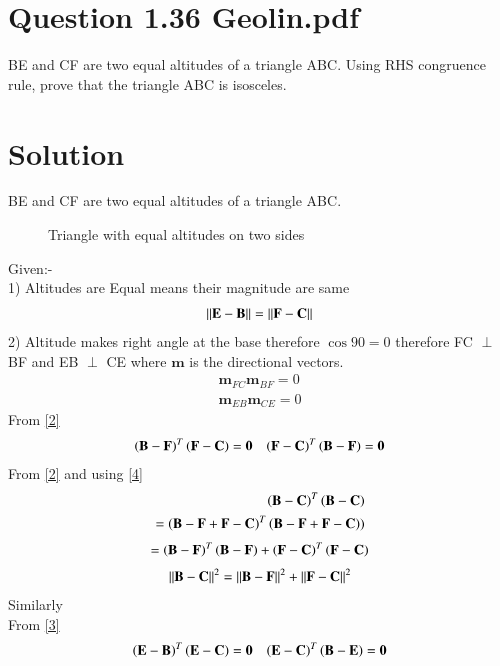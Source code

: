 \documentclass[journal,12pt,twocolumn]{IEEEtran}
\begin{document}
\section{Question 1.36 Geolin.pdf }
BE and CF are two equal altitudes of a triangle ABC. Using RHS congruence rule, prove that the triangle ABC is isosceles.
\section{Solution}
BE and CF are two equal altitudes of a triangle ABC.
\captionsetup{justification=centering}
\begin{figure}[!h]
\centering
\resizebox{.5\columnwidth}{!}{}
\caption{Triangle with equal altitudes on two sides}
\label{myfig}
\end{figure}
Given:-\\
1) Altitudes are Equal means their magnitude are same
 \begin{align}
 	\left\lVert\mathbf{E} - \mathbf{B}\right\rVert = \left\lVert\mathbf{F} - \mathbf{C}\right\rVert \label{1}
 \end{align}
2) Altitude makes right angle at the base therefore $\cos 90 =0$ therefore  FC $\perp$ BF and EB $\perp$ CE where $\textbf{m}$ is the directional vectors.
\begin{align}
\textbf{m}_{FC} \textbf{m}_{BF} = 0 \label{2}\\
\textbf{m}_{EB} \textbf{m}_{CE} = 0 \label{3}
\end{align}
From \eqref{2}
\begin{align}
    \left(\mathbf{B}-\mathbf{F}\right)^T\left(\mathbf{F}-\mathbf{C}\right)=\mathbf{0} && \left(\mathbf{F}-\mathbf{C}\right)^T\left(\mathbf{B}-\mathbf{F}\right)=\mathbf{0}\label{4}
\end{align}
From \eqref{2} and using \eqref{4} 
\begin{align}
    \left(\mathbf{B}-\mathbf{C}\right)^T\left(\mathbf{B}-\mathbf{C}\right)\\
    =\left(\mathbf{B}-\mathbf{F}+\mathbf{F}-\mathbf{C}\right)^T\left(\mathbf{B}-\mathbf{F}+\mathbf{F}-\mathbf{C}\right))
    \end{align}
    \begin{align}
      =\left(\mathbf{B}-\mathbf{F}\right)^T\left(\mathbf{B}-\mathbf{F}\right)+\left(\mathbf{F}-\mathbf{C}\right)^T\left(\mathbf{F}-\mathbf{C}\right) 
    \end{align}
\begin{align}
   \left\lVert\mathbf{B}-\mathbf{C}\right\rVert^2=\left\lVert\mathbf{B}-\mathbf{F}\right\rVert^2+\left\lVert\mathbf{F}-\mathbf{C}\right\rVert^2\label{8} 
    \end{align}
    Similarly\\
    From \eqref{3}
    \begin{align}
        \left(\mathbf{E}-\mathbf{B}\right)^T\left(\mathbf{E}-\mathbf{C}\right)=\mathbf{0} && \left(\mathbf{E}-\mathbf{C}\right)^T\left(\mathbf{B}-\mathbf{E}\right)=\mathbf{0}\label{9}
        \end{align}
\end{document}
